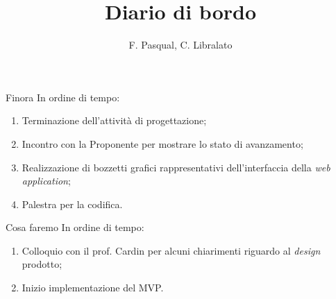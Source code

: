 \documentclass{beamer}
\title{Diario di bordo}
\author[F. Pasqual, C. Libralato]{F. Pasqual, C. Libralato}
\begin{document}
{
\begin{frame}
    \titlepage
\end{frame}
}

\begin{frame}{Finora}
    In ordine di tempo:
    \begin{enumerate}
        \setlength{\itemsep}{0.9em}
        \item Terminazione dell'attività di progettazione;
        \item Incontro con la Proponente per mostrare lo stato di avanzamento;
        \item Realizzazione di bozzetti grafici rappresentativi dell'interfaccia della \textit{web application};
        \item Palestra per la codifica.
    \end{enumerate}
\end{frame}

\begin{frame}{Cosa faremo}
    In ordine di tempo:
    \begin{enumerate}
        \setlength{\itemsep}{1.2em}
        \item Colloquio con il prof. Cardin per alcuni chiarimenti riguardo al \textit{design} prodotto;
        \item Inizio implementazione del MVP.
    \end{enumerate}
\end{frame}


\end{document}
